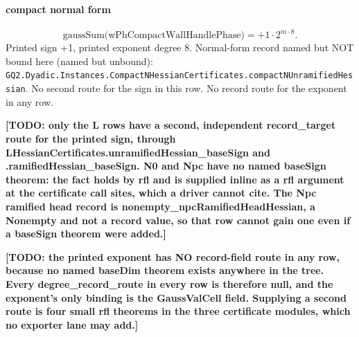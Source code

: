\paragraph{compact normal form}
\[\mathrm{gaussSum}\bigl(\mathrm{wPhCompactWallHandlePhase}\bigr)=+1\cdot 2^{m\cdot 8}.\]
Printed sign +1, printed exponent degree 8. Normal-form record named but NOT bound here (named but unbound): \texttt{GQ2.Dyadic.Instances.CompactNHessianCertificates.compactNUnramifiedHessian}.
No second route for the sign in this row. No record route for the exponent in any row.
\par\noindent\textbf{[TODO: only the L rows have a second, independent record\_target route for the printed sign, through LHessianCertificates.unramifiedHessian\_baseSign and .ramifiedHessian\_baseSign. N0 and Npc have no named baseSign theorem: the fact holds by rfl and is supplied inline as a rfl argument at the certificate call sites, which a driver cannot cite. The Npc ramified head record is nonempty\_npcRamifiedHeadHessian, a Nonempty and not a record value, so that row cannot gain one even if a baseSign theorem were added.]}
\par\noindent\textbf{[TODO: the printed exponent has NO record-field route in any row, because no named baseDim theorem exists anywhere in the tree. Every degree\_record\_route in every row is therefore null, and the exponent's only binding is the GaussValCell field. Supplying a second route is four small rfl theorems in the three certificate modules, which no exporter lane may add.]}
